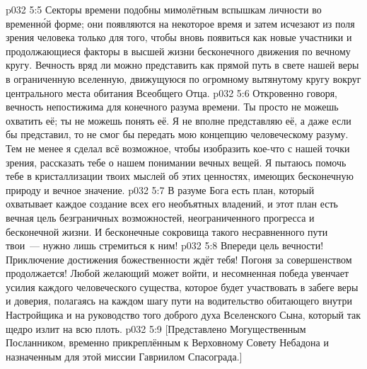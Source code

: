 \vs p032 5:5 Секторы времени подобны мимолётным вспышкам личности во временн\'ой форме; они появляются на некоторое время и затем исчезают из поля зрения человека только для того, чтобы вновь появиться как новые участники и продолжающиеся факторы в высшей жизни бесконечного движения по вечному кругу. Вечность вряд ли можно представить как прямой путь в свете нашей веры в ограниченную вселенную, движущуюся по огромному вытянутому кругу вокруг центрального места обитания Всеобщего Отца.
\vs p032 5:6 Откровенно говоря, вечность непостижима для конечного разума времени. Ты просто не можешь охватить её; ты не можешь понять её. Я не вполне представляю её, а даже если бы представил, то не смог бы передать мою концепцию человеческому разуму. Тем не менее я сделал всё возможное, чтобы изобразить кое-что с нашей точки зрения, рассказать тебе о нашем понимании вечных вещей. Я пытаюсь помочь тебе в кристаллизации твоих мыслей об этих ценностях, имеющих бесконечную природу и вечное значение.
\vs p032 5:7 \pc В разуме Бога есть план, который охватывает каждое создание всех его необъятных владений, и этот план есть вечная цель безграничных возможностей, неограниченного прогресса и бесконечной жизни. И бесконечные сокровища такого несравненного пути твои~--- нужно лишь стремиться к ним!
\vs p032 5:8 Впереди цель вечности! Приключение достижения божественности ждёт тебя! Погоня за совершенством продолжается! Любой желающий может войти, и несомненная победа увенчает усилия каждого человеческого существа, которое будет участвовать в забеге веры и доверия, полагаясь на каждом шагу пути на водительство обитающего внутри Настройщика и на руководство того доброго духа Вселенского Сына, который так щедро излит на всю плоть.
\vsetoff
\vs p032 5:9 [Представлено Могущественным Посланником, временно прикреплённым к Верховному Совету Небадона и назначенным для этой миссии Гавриилом Спасограда.]
\quizlink
